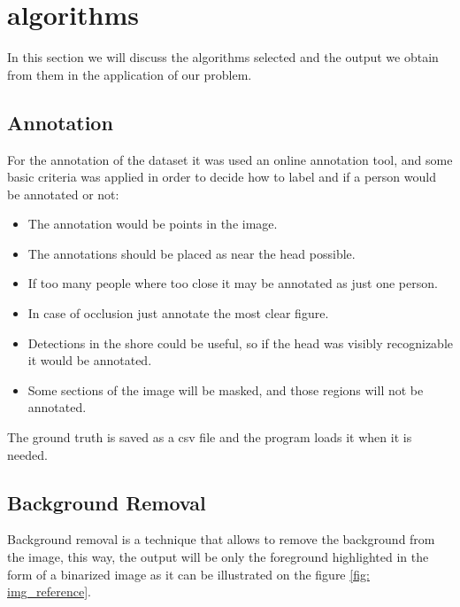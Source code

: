 \documentclass[10pt]{article}
\begin{document}
\section{algorithms}
In this section we will discuss the algorithms selected and the output we obtain from them in the application of our problem.

\subsection{Annotation}

For the annotation of the dataset it was used an online annotation tool, and some basic criteria was applied in order to decide how to label and if a person would be annotated or not:
\begin{itemize}
  \item The annotation would be points in the image.
  \item The annotations should be placed as near the head possible.
  \item If too many people where too close it may be annotated as just one person.
  \item In case of occlusion just annotate the most clear figure.
  \item Detections in the shore could be useful, so if the head was visibly recognizable it would be annotated.
  \item Some sections of the image will be masked, and those regions will not be annotated.
\end{itemize}

The ground truth is saved as a csv file and the program loads it when it is needed.

\subsection{Background Removal}
Background removal is a technique that allows to remove the background from the image, this way, the output will be only the foreground highlighted in the form of a binarized image as it can be illustrated on the figure \ref{fig: img_reference}.
\end{document}
